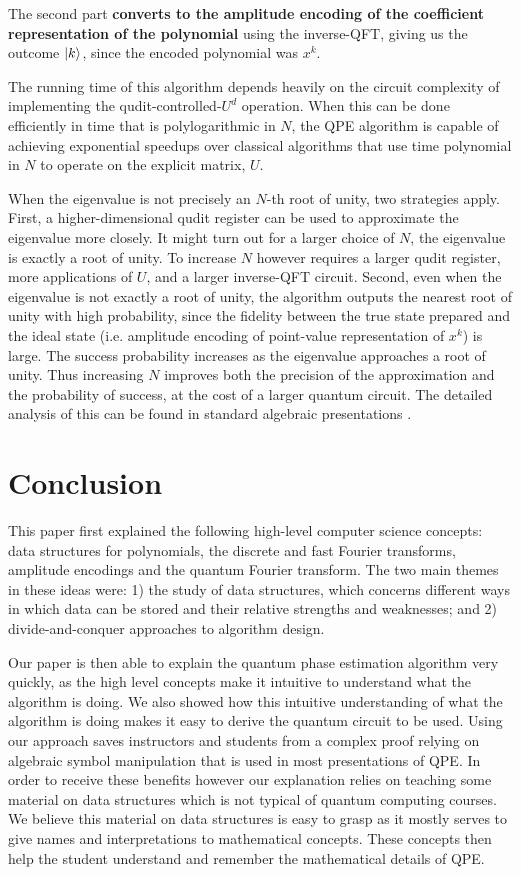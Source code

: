 \documentclass[prb,preprint]{revtex4}
\begin{document}
	The second part \textbf{converts to the amplitude encoding of the coefficient representation of the polynomial} using the inverse-QFT, giving us the outcome $\ket{k}$, since the encoded polynomial was $x^k$. 
	
	The running time of this algorithm depends heavily on the circuit complexity of implementing the qudit-controlled-$U^d$ operation. When this can be done efficiently in time that is polylogarithmic in $N$, the QPE algorithm is capable of achieving exponential speedups over classical algorithms that use time polynomial in $N$ to operate on the explicit matrix, $U$.
	
	When the eigenvalue is not precisely an $N$-th root of unity, two strategies apply. First, a higher-dimensional qudit register can be used to approximate the eigenvalue more closely. It might turn out for a larger choice of $N$, the eigenvalue is exactly a root of unity. To increase $N$ however requires a larger qudit register, more applications of $U$, and a larger inverse-QFT circuit. Second, even when the eigenvalue is not exactly a root of unity, the algorithm outputs the nearest root of unity with high probability, since the fidelity between the true state prepared and the ideal state (i.e. amplitude encoding of point-value representation of $x^k$) is large. The success probability increases as the eigenvalue approaches a root of unity. Thus increasing $N$ improves both the precision of the approximation and the probability of success, at the cost of a larger quantum circuit. The detailed analysis of this can be found in standard algebraic presentations \cite{nielsen2010quantum}. 
	
	\section{Conclusion}
	
	This paper first explained the following high-level computer science concepts: data structures for polynomials, the discrete and fast Fourier transforms, amplitude encodings and the quantum Fourier transform. The two main themes in these ideas were: 1) the study of data structures, which concerns different ways in which data can be stored and their relative strengths and weaknesses; and 2) divide-and-conquer approaches to algorithm design.
	
	Our paper is then able to explain the quantum phase estimation algorithm very quickly, as the high level concepts make it intuitive to understand what the algorithm is doing. We also showed how this intuitive understanding of what the algorithm is doing makes it easy to derive the quantum circuit to be used. Using our approach saves instructors and students from a complex proof relying on algebraic symbol manipulation that is used in most presentations of QPE. In order to receive these benefits however our explanation relies on teaching some material on data structures which is not typical of quantum computing courses. We believe this material on data structures is easy to grasp as it mostly serves to give names and interpretations to mathematical concepts. These concepts then help the student understand and remember the mathematical details of QPE.
	
\end{document}
